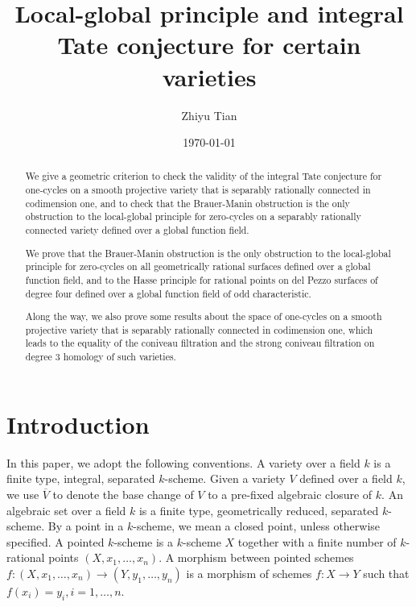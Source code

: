 \documentclass{amsart}
\title[Local-global principle and integral Tate conjecture ]{Local-global principle and integral Tate conjecture for certain varieties}
\author[Tian]{Zhiyu Tian}
\date{\today}
\theoremstyle{definition}
\theoremstyle{remark}
\begin{document}

\begin{abstract}
We give a geometric criterion to check the validity of the integral Tate conjecture for one-cycles on a smooth projective variety that is separably rationally connected in codimension one, and to check that the Brauer-Manin obstruction is the only obstruction to the local-global principle for zero-cycles on a separably rationally connected variety defined over a global function field.
 
 We prove that the Brauer-Manin obstruction is the only obstruction to the local-global principle for zero-cycles on all geometrically rational surfaces defined over a global function field, and to the Hasse principle for rational points on del Pezzo surfaces of degree four defined over a global function field of odd characteristic.  

 Along the way, we also prove some results about the space of one-cycles on a smooth projective variety that is separably rationally connected in codimension one, which leads to the equality of the coniveau filtration and the strong coniveau filtration on degree $3$ homology of such varieties.
\end{abstract}


\maketitle

\tableofcontents

\section{Introduction}
In this paper, we adopt the following conventions. 
A variety over a field $k$ is a finite type, integral, separated $k$-scheme. 
Given a variety $V$ defined over a field $k$, 
we use $\overline{V}$ to denote the base change of $V$ to a pre-fixed algebraic closure of $k$.
An algebraic set over a field $k$ is a finite type, geometrically reduced, separated $k$-scheme. 
By a point in a $k$-scheme, we mean a closed point, unless otherwise specified.
A pointed $k$-scheme is a $k$-scheme $X$ together with a finite number of $k$-rational points $(X, x_1, \ldots, x_n)$. A morphism between pointed schemes $f:(X, x_1, \ldots, x_n) \to (Y, y_1, \ldots, y_n)$ is a morphism of schemes $f: X \to Y$ such that $f(x_i)=y_i, i=1, \ldots, n$. 
\end{document}
